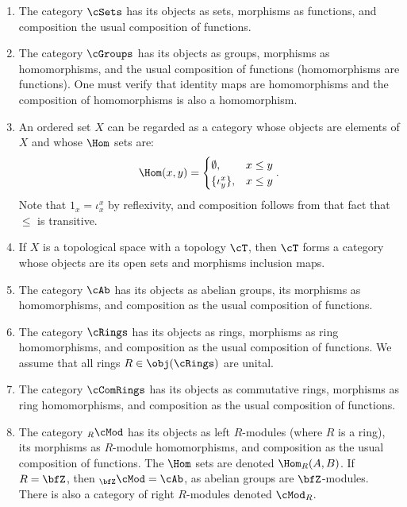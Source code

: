     \begin{example}
        \begin{enumerate}[label = (\arabic*)]
            \item The category $\cSets$ has its objects as sets, morphisms as functions, and composition the usual composition of functions.
            \item The category $\cGroups$ has its objects as groups, morphisms as homomorphisms, and the usual composition of functions (homomorphisms are functions). One must verify that identity maps are homomorphisms and the composition of homomorphisms is also a homomorphism.
            \item An ordered set $X$ can be regarded as a category whose objects are elements of $X$ and whose $\Hom$ sets are:
                \begin{equation*}
                \begin{split}
                    \Hom(x,y) = \begin{cases} \emptyset, & x \leq y \\ \{\iota_y ^ x\}, & x \leq y \end{cases}.
                \end{split}
                \end{equation*}
            Note that $1_x = \iota_x^x$ by reflexivity, and composition follows from that fact that $\leq$ is transitive.
            \item If $X$ is a topological space with a topology $\cT$, then $\cT$ forms a category whose objects are its open sets and morphisms inclusion maps.
            \item The category $\cAb$ has its objects as abelian groups, its morphisms as homomorphisms, and composition as the usual composition of functions.
            \item The category $\cRings$ has its objects as rings, morphisms as ring homomorphisms, and composition as the usual composition of functions. We assume that all rings $R \in \obj(\cRings)$ are unital.
            \item The category $\cComRings$ has its objects as commutative rings, morphisms as ring homomorphisms, and composition as the usual composition of functions.
            \item The category $_R\cMod$ has its objects as left $R$-modules (where $R$ is a ring), its morphisms as $R$-module homomorphisms, and composition as the usual composition of functions. The $\Hom$ sets are denoted $\Hom_R(A,B)$. If $R = \bfZ$, then $_\bfZ\cMod = \cAb$, as abelian groups are $\bfZ$-modules. There is also a category of right $R$-modules denoted $\cMod_R$.
        \end{enumerate}
    \end{example}

